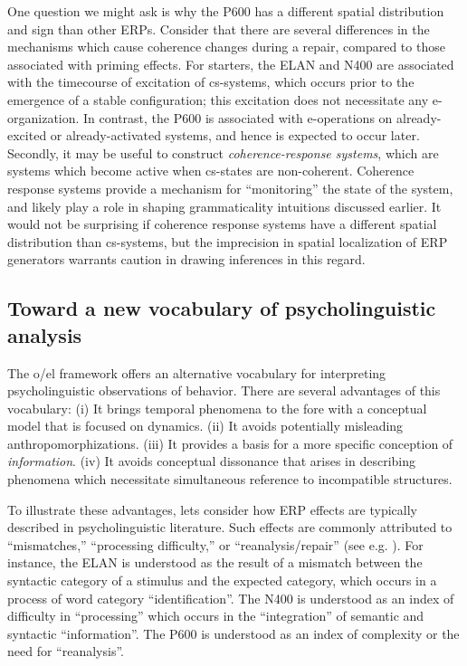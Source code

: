 One question we might ask is why the P600 has a different spatial distribution and sign than other ERPs. Consider that there are several differences in the mechanisms which cause coherence changes during a repair, compared to those associated with priming effects. For starters, the ELAN and N400 are associated with the timecourse of excitation of cs-systems, which occurs prior to the emergence of a stable configuration; this excitation does not necessitate any e-organization. In contrast, the P600 is associated with e-operations on already-excited or already-activated systems, and hence is expected to occur later. Secondly, it may be useful to construct \textit{coherence-response systems}, which are systems which become active when cs-states are non-coherent. Coherence response systems provide a mechanism for “monitoring” the state of the system, and likely play a role in shaping grammaticality intuitions discussed earlier. It would not be surprising if coherence response systems have a different spatial distribution than cs-systems, but the imprecision in spatial localization of ERP generators warrants caution in drawing inferences in this regard.

\subsection{Toward a new vocabulary of psycholinguistic analysis}

The o/el framework offers an alternative vocabulary for interpreting psycholinguistic observations of behavior. There are several advantages of this vocabulary: (i) It brings temporal phenomena to the fore with a conceptual model that is focused on dynamics. (ii) It avoids potentially misleading anthropomorphizations. (iii) It provides a basis for a more specific conception of \textit{information}. (iv) It avoids conceptual dissonance that arises in describing phenomena which necessitate simultaneous reference to incompatible structures.

To illustrate these advantages, lets consider how ERP effects are typically described in psycholinguistic literature. Such effects are commonly attributed to “mismatches,” “processing difficulty,” or “reanalysis/repair” (see e.g. \citealt{Friederici2002,KutasFedermeier2011}). For instance, the ELAN is understood as the result of a mismatch between the syntactic category of a stimulus and the expected category, which occurs in a process of word category “identification”. The N400 is understood as an index of difficulty in “processing” which occurs in the “integration” of semantic and syntactic “information”. The P600 is understood as an index of complexity or the need for “reanalysis”.

